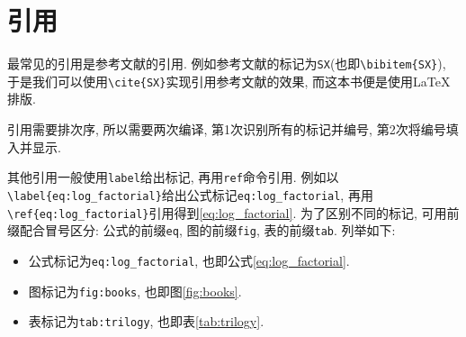 \chapter{引用}

最常见的引用是参考文献的引用. 例如参考文献\cite{SX}的标记为\verb=SX=(也即\verb=\bibitem{SX}=), 
于是我们可以使用\verb=\cite{SX}=实现引用参考文献\cite{SX}的效果, 
而这本书便是使用\LaTeX{}排版. 

引用需要排次序, 所以需要两次编译, 第1次识别所有的标记并编号, 第2次将编号填入并显示. 

其他引用一般使用\verb=label=给出标记, 再用\verb=ref=命令引用. 
例如以\verb=\label{eq:log_factorial}=给出公式标记\verb=eq:log_factorial=, 
再用\verb=\ref{eq:log_factorial}=引用得到\ref{eq:log_factorial}. 
为了区别不同的标记, 可用前缀配合冒号区分: 公式的前缀\verb=eq=, 图的前缀\verb=fig=, 表的前缀\verb=tab=.
列举如下:
\begin{itemize}
    \item 公式标记为\verb=eq:log_factorial=, 也即公式\ref{eq:log_factorial}.
    \item 图标记为\verb=fig:books=, 也即图\ref{fig:books}.
    \item 表标记为\verb=tab:trilogy=, 也即表\ref{tab:trilogy}.
\end{itemize}
